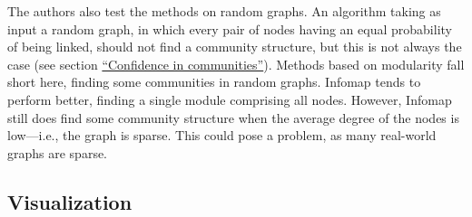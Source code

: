 The authors also test the methods on random graphs. An algorithm taking
as input a random graph, in which every pair of nodes having an equal
probability of being linked, should not find a community structure, but
this is not always the case (see section
\protect\hyperlink{confidence-in-communities}{``Confidence in
communities''}). Methods based on modularity fall short here, finding
some communities in random graphs. Infomap tends to perform better,
finding a single module comprising all nodes. However, Infomap still
does find some community structure when the average degree of the nodes
is low---i.e., the graph is sparse. This could pose a problem, as many
real-world graphs are sparse.



\subsection{Visualization}\label{visualization}
